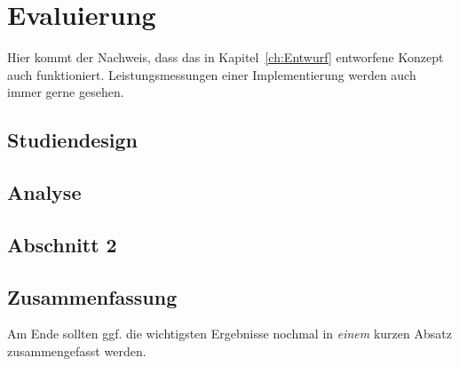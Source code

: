 
\chapter{Evaluierung}
\label{ch:Evaluierung}
Hier kommt der Nachweis, dass das in Kapitel~\ref{ch:Entwurf}
entworfene Konzept auch funktioniert. Leistungsmessungen einer
Implementierung werden auch immer gerne gesehen.


\section{Studiendesign}
\label{ch:Implementierung:sec:Studiendesign}







\section{Analyse}
\label{ch:Evaluierung:sec:Abschnitt1}



\section{Abschnitt 2}
\label{ch:Evaluierung:sec:Abschnitt2}



\section{Zusammenfassung}
\label{ch:Evaluierung:sec:zusammenfassung}

Am Ende sollten ggf. die wichtigsten Ergebnisse nochmal in \emph{einem}
kurzen Absatz zusammengefasst werden.

